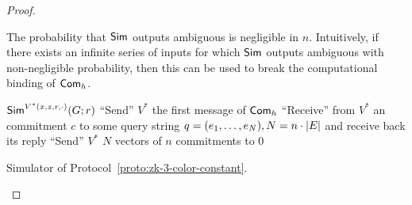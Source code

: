 \begin{proof}
\begin{claim} The probability that ${\sf Sim}$ outputs {\sf ambiguous} is negligible in $n$.
Intuitively, if there exists an infinite series of inputs for which ${\sf Sim}$ outputs {\sf ambiguous} with non-negligible probability, then this can be used to break the computational binding of ${\sf Com}_h$.
\end{claim}

\begin{algorithm}
${\sf Sim}^{V^*(x,z,r,\cdot)}(G;r)$\;
``Send'' $V^*$ the first message of ${\sf Com}_h$\;
``Receive'' from $V^*$ an commitment $c$ to some query string $q=(e_1,\ldots,e_N),N=n\cdot\left|E\right|$ and receive back its reply\;
``Send'' $V^*$ $N$ vectors of $n$ commitments to $0$\;

\caption{Simulator of Protocol~\ref{proto:zk-3-color-constant}.}\label{alg:zk-3-color-constant-sim}
\end{algorithm}

\end{proof}